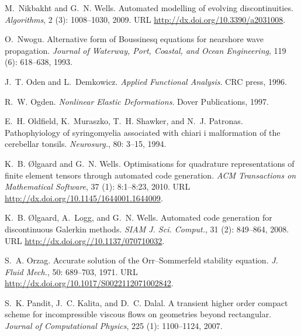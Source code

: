 \begin{thebibliography}{467}
M.~Nikbakht and G.~N. Wells.
\newblock Automated modelling of evolving discontinuities.
\newblock \emph{Algorithms}, 2 (3): 1008--1030, 2009.
\newblock URL \url{http://dx.doi.org/10.3390/a2031008}.

O.~Nwogu.
\newblock Alternative form of {B}oussinesq equations for nearshore wave
  propagation.
\newblock \emph{Journal of Waterway, Port, Coastal, and Ocean Engineering},
  119 (6): 618--638, 1993.

J.~T. Oden and L.~Demkowicz.
\newblock \emph{Applied Functional Analysis}.
\newblock CRC press, 1996.

R.~W. Ogden.
\newblock \emph{Nonlinear Elastic Deformations}.
\newblock Dover Publications, 1997.

E.~H. Oldfield, K.~Muraszko, T.~H. Shawker, and N.~J. Patronas.
\newblock Pathophyiology of syringomyelia associated with chiari i malformation
  of the cerebellar tonsils.
\newblock \emph{Neurosurg.}, 80: 3--15, 1994.

K.~B. \O{}lgaard and G.~N. Wells.
\newblock Optimisations for quadrature representations of finite element
  tensors through automated code generation.
\newblock \emph{ACM Transactions on Mathematical Software}, 37
  (1): 8:1--8:23, 2010.
\newblock URL \url{http://dx.doi.org/10.1145/1644001.1644009}.

K.~B. {\O}lgaard, A.~Logg, and G.~N. Wells.
\newblock Automated code generation for discontinuous {G}alerkin methods.
\newblock \emph{SIAM J. Sci. Comput.}, 31 (2): 849--864,
  2008.
\newblock URL \url{http://dx.doi.org//10.1137/070710032}.

S.~A. Orzag.
\newblock Accurate solution of the {O}rr--{S}ommerfeld stability equation.
\newblock \emph{J. Fluid Mech.}, 50: 689--703, 1971.
\newblock URL \url{http://dx.doi.org/10.1017/S0022112071002842}.

S.~K. Pandit, J.~C. Kalita, and D.~C. Dalal.
\newblock A transient higher order compact scheme for incompressible viscous
  flows on geometries beyond rectangular.
\newblock \emph{Journal of Computational Physics}, 225 (1):
  1100--1124, 2007.


\end{thebibliography}
